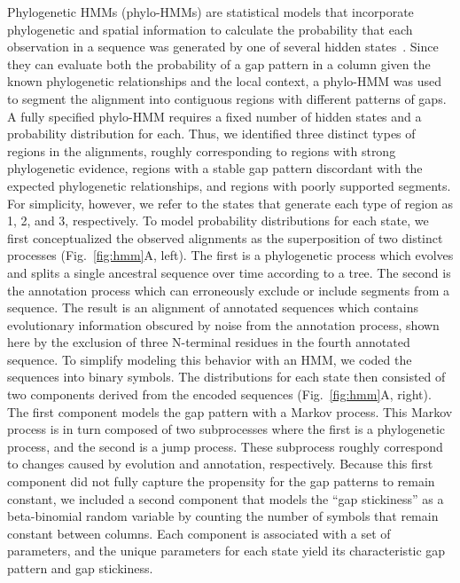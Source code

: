 Phylogenetic HMMs (phylo-HMMs) are statistical models that incorporate phylogenetic and spatial information to calculate the probability that each observation in a sequence was generated by one of several hidden states~\cite{Felsenstein1996, Siepel2004}. Since they can evaluate both the probability of a gap pattern in a column given the known phylogenetic relationships and the local context, a phylo-HMM was used to segment the alignment into contiguous regions with different patterns of gaps. A fully specified phylo-HMM requires a fixed number of hidden states and a probability distribution for each. Thus, we identified three distinct types of regions in the alignments, roughly corresponding to regions with strong phylogenetic evidence, regions with a stable gap pattern discordant with the expected phylogenetic relationships, and regions with poorly supported segments. For simplicity, however, we refer to the states that generate each type of region as 1, 2, and 3, respectively. To model probability distributions for each state, we first conceptualized the observed alignments as the superposition of two distinct processes (Fig.~\ref{fig:hmm}A, left). The first is a phylogenetic process which evolves and splits a single ancestral sequence over time according to a tree. The second is the annotation process which can erroneously exclude or include segments from a sequence. The result is an alignment of annotated sequences which contains evolutionary information obscured by noise from the annotation process, shown here by the exclusion of three N-terminal residues in the fourth annotated sequence. To simplify modeling this behavior with an HMM, we coded the sequences into binary symbols. The distributions for each state then consisted of two components derived from the encoded sequences (Fig.~\ref{fig:hmm}A, right). The first component models the gap pattern with a Markov process. This Markov process is in turn composed of two subprocesses where the first is a phylogenetic process, and the second is a jump process. These subprocess roughly correspond to changes caused by evolution and annotation, respectively. Because this first component did not fully capture the propensity for the gap patterns to remain constant, we included a second component that models the ``gap stickiness'' as a beta-binomial random variable by counting the number of symbols that remain constant between columns. Each component is associated with a set of parameters, and the unique parameters for each state yield its characteristic gap pattern and gap stickiness.

